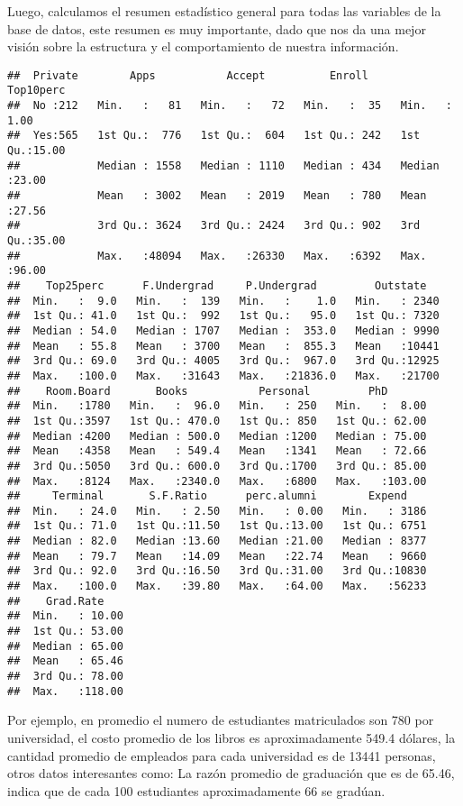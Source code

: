 \documentclass[
  12pt,
  letterpaper,
]{article}
\begin{document}
Luego, calculamos el resumen estadístico general para todas las
variables de la base de datos, este resumen es muy importante, dado que
nos da una mejor visión sobre la estructura y el comportamiento de
nuestra información.

\begin{verbatim}
##  Private        Apps           Accept          Enroll       Top10perc    
##  No :212   Min.   :   81   Min.   :   72   Min.   :  35   Min.   : 1.00  
##  Yes:565   1st Qu.:  776   1st Qu.:  604   1st Qu.: 242   1st Qu.:15.00  
##            Median : 1558   Median : 1110   Median : 434   Median :23.00  
##            Mean   : 3002   Mean   : 2019   Mean   : 780   Mean   :27.56  
##            3rd Qu.: 3624   3rd Qu.: 2424   3rd Qu.: 902   3rd Qu.:35.00  
##            Max.   :48094   Max.   :26330   Max.   :6392   Max.   :96.00  
##    Top25perc      F.Undergrad     P.Undergrad         Outstate    
##  Min.   :  9.0   Min.   :  139   Min.   :    1.0   Min.   : 2340  
##  1st Qu.: 41.0   1st Qu.:  992   1st Qu.:   95.0   1st Qu.: 7320  
##  Median : 54.0   Median : 1707   Median :  353.0   Median : 9990  
##  Mean   : 55.8   Mean   : 3700   Mean   :  855.3   Mean   :10441  
##  3rd Qu.: 69.0   3rd Qu.: 4005   3rd Qu.:  967.0   3rd Qu.:12925  
##  Max.   :100.0   Max.   :31643   Max.   :21836.0   Max.   :21700  
##    Room.Board       Books           Personal         PhD        
##  Min.   :1780   Min.   :  96.0   Min.   : 250   Min.   :  8.00  
##  1st Qu.:3597   1st Qu.: 470.0   1st Qu.: 850   1st Qu.: 62.00  
##  Median :4200   Median : 500.0   Median :1200   Median : 75.00  
##  Mean   :4358   Mean   : 549.4   Mean   :1341   Mean   : 72.66  
##  3rd Qu.:5050   3rd Qu.: 600.0   3rd Qu.:1700   3rd Qu.: 85.00  
##  Max.   :8124   Max.   :2340.0   Max.   :6800   Max.   :103.00  
##     Terminal       S.F.Ratio      perc.alumni        Expend     
##  Min.   : 24.0   Min.   : 2.50   Min.   : 0.00   Min.   : 3186  
##  1st Qu.: 71.0   1st Qu.:11.50   1st Qu.:13.00   1st Qu.: 6751  
##  Median : 82.0   Median :13.60   Median :21.00   Median : 8377  
##  Mean   : 79.7   Mean   :14.09   Mean   :22.74   Mean   : 9660  
##  3rd Qu.: 92.0   3rd Qu.:16.50   3rd Qu.:31.00   3rd Qu.:10830  
##  Max.   :100.0   Max.   :39.80   Max.   :64.00   Max.   :56233  
##    Grad.Rate     
##  Min.   : 10.00  
##  1st Qu.: 53.00  
##  Median : 65.00  
##  Mean   : 65.46  
##  3rd Qu.: 78.00  
##  Max.   :118.00
\end{verbatim}

Por ejemplo, en promedio el numero de estudiantes matriculados son 780
por universidad, el costo promedio de los libros es aproximadamente
549.4 dólares, la cantidad promedio de empleados para cada universidad
es de 13441 personas, otros datos interesantes como: La razón promedio
de graduación que es de 65.46, indica que de cada 100 estudiantes
aproximadamente 66 se gradúan.
\end{document}
